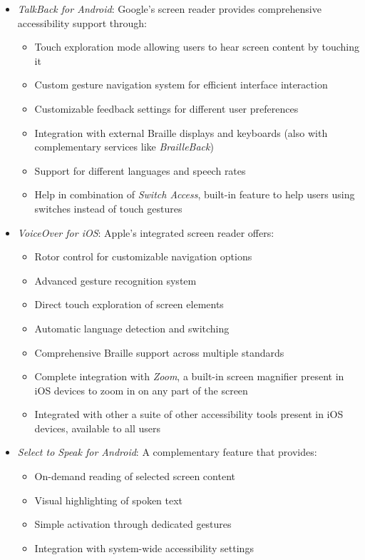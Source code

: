 \begin{itemize}
    \item \textit{TalkBack for Android}: Google's screen reader provides comprehensive accessibility support through:
        \begin{itemize}
            \item Touch exploration mode allowing users to hear screen content by touching it
            \item Custom gesture navigation system for efficient interface interaction
            \item Customizable feedback settings for different user preferences
            \item Integration with external Braille displays and keyboards (also with complementary services like \textit{BrailleBack})
            \item Support for different languages and speech rates
            \item Help in combination of \textit{Switch Access}, built-in feature to help users using switches instead of touch gestures
        \end{itemize}
    
    \item \textit{VoiceOver for iOS}: Apple's integrated screen reader offers:
        \begin{itemize}
            \item Rotor control for customizable navigation options
            \item Advanced gesture recognition system
            \item Direct touch exploration of screen elements
            \item Automatic language detection and switching
            \item Comprehensive Braille support across multiple standards
            \item Complete integration with \textit{Zoom}, a built-in screen magnifier present in iOS devices to zoom in on any part of the screen
            \item Integrated with other a suite of other accessibility tools present in iOS devices, available to all users
        \end{itemize}

    \item \textit{Select to Speak for Android}: A complementary feature that provides:
        \begin{itemize}
            \item On-demand reading of selected screen content
            \item Visual highlighting of spoken text
            \item Simple activation through dedicated gestures
            \item Integration with system-wide accessibility settings
        \end{itemize}
\end{itemize}

